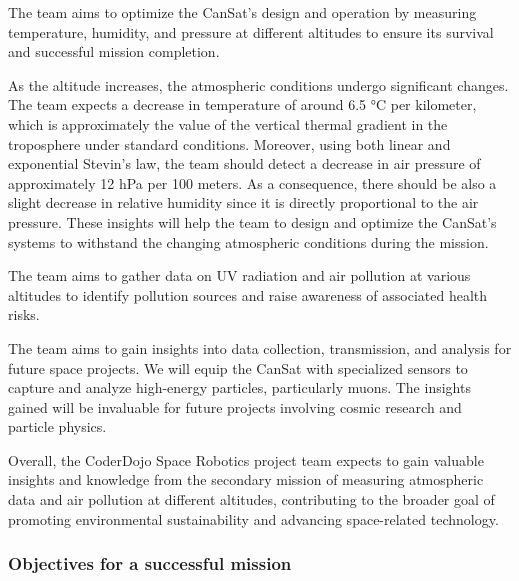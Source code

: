 The team aims to optimize the CanSat's design and operation by measuring temperature, humidity, and pressure at different altitudes to ensure its survival and successful mission completion.

As the altitude increases, the atmospheric conditions undergo significant changes. The team expects a decrease in temperature of around 6.5 °C per kilometer, which is approximately the value of the vertical thermal gradient in the troposphere under standard conditions. Moreover, using both linear and exponential Stevin's law, 
the team should detect a decrease in air pressure of approximately 12 hPa per 100 meters. As a consequence, there should be also a slight decrease in relative humidity since it is directly proportional to the air pressure. These insights will help the team to design and optimize the CanSat's systems to withstand the changing atmospheric conditions during the mission.


The team aims to gather data on UV radiation and air pollution at various altitudes to identify pollution sources and raise awareness of associated health risks.

The team aims to gain insights into data collection, transmission, and analysis for future space projects. We will equip the CanSat with specialized sensors to capture and analyze high-energy particles, particularly muons. The insights gained will be invaluable for future projects involving cosmic research and particle physics.

Overall, the CoderDojo Space Robotics project team expects to gain valuable insights and knowledge from the secondary mission of measuring atmospheric data and air pollution at different altitudes, contributing to the broader goal of promoting environmental sustainability and advancing space-related technology.

\subsubsection{Objectives for a successful mission}

